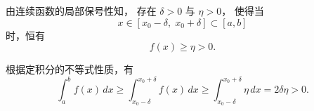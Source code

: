 \documentclass[../book.tex]{subfiles}
\begin{document}
\begin{enumerate}
\begin{analysisbox}[证]
            由连续函数的局部保号性知，
            存在 $\delta>0$ 与 $\eta>0$，
            使得当
            \[
                x\in[x_0-\delta,\;x_0+\delta]\subset[a,b]
            \]
            时，恒有
            \[
                f(x)\ge \eta>0.
            \]

            根据定积分的不等式性质，有
            \[
                \int_a^b f(x)\,dx
                \ge
                \int_{x_0-\delta}^{x_0+\delta} f(x)\,dx
                \ge
                \int_{x_0-\delta}^{x_0+\delta} \eta\,dx
                =
                2\delta\eta
                >0.
            \]
        \end{analysisbox}
    \end{enumerate}
\end{document}
